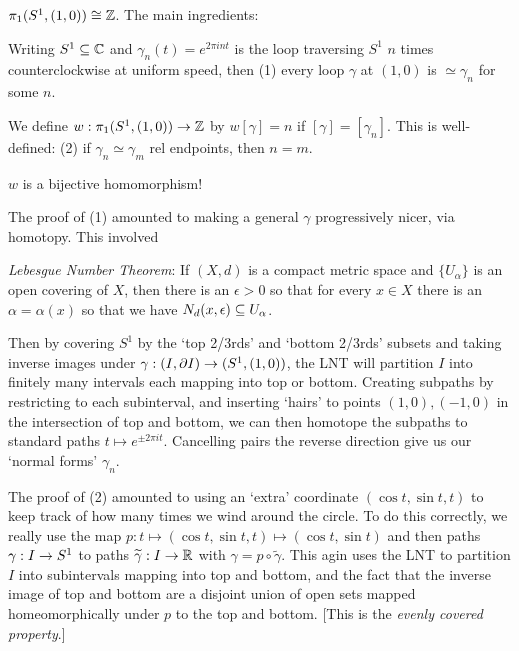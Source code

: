 \documentclass[12pt]{article}
\begin{document}
\msk

$\pi_1(S^1,(1,0))\cong{\mathbb Z}$. The main ingredients:

\ssk

Writing $S^1\subseteq{\mathbb C}$ and $\gamma_n(t)=e^{2\pi int}$ is the loop
traversing $S^1$ $n$ times counterclockwise at uniform speed,
then (1) every loop $\gamma$ at $(1,0)$ is $\simeq\gamma_n$ for some $n$.

\ssk

We define $w:\pi_1(S^1,(1,0))\rightarrow{\mathbb Z}$ by $w[\gamma] = n$ if
$[\gamma]=[\gamma_n]$. This is well-defined:
(2) if $\gamma_n\simeq\gamma_m$ rel endpoints, then $n=m$.

\ssk

$w$ is a bijective homomorphism!

\ssk

The proof of (1) amounted to making a general $\gamma$ progressively nicer, 
via homotopy. This involved 

\ssk

{\it Lebesgue Number Theorem}: If $(X,d)$ is a compact metric space and
$\{U_\alpha\}$ is an open covering of $X$, then there is an $\epsilon>0$
so that for every $x\in X$ there is an $\alpha=\alpha(x)$ so that 
we have $N_d(x,\epsilon)\subseteq U_\alpha$.

\ssk

Then by covering $S^1$ by the `top 2/3rds' and `bottom 2/3rds' subsets
and taking inverse images under $\gamma:(I,\partial I)\rightarrow (S^1,(1,0))$,
the LNT will partition $I$ into finitely many intervals each mapping into
top or bottom. Creating subpaths by restricting to each subinterval, and inserting
`hairs' to points $(1,0),(-1,0)$ in the intersection of top and bottom,
we can then homotope the subpaths to standard paths $t\mapsto e^{\pm 2\pi it}$.
Cancelling pairs the reverse direction give us our `normal forms'
$\gamma_n$.

\ssk

The proof of (2) amounted to using an `extra' coordinate $(\cos t,\sin t,t)$
to keep track of how many times we wind around the circle. To do this correctly,
we really use the map $p:t\mapsto(\cos t,\sin t,t)\mapsto(\cos t,\sin t)$ and
then  paths $\gamma:I\rightarrow S^1$ to paths 
$\widetilde{\gamma}:I\rightarrow {\mathbb R}$ with $\gamma = p\circ\widetilde{\gamma}$. 
This agin uses the LNT to partition $I$ into subintervals mapping into top and bottom,
and the fact that the inverse image of top and bottom are a disjoint
union of open sets mapped homeomorphically under $p$ to the top and bottom.
[This is the {\it evenly covered property}.]
\end{document}
